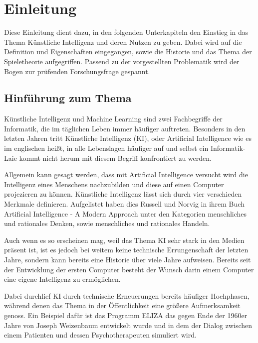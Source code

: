 
\chapter{Einleitung}
Diese Einleitung dient dazu, in den folgenden Unterkapiteln den Einstieg in das Thema Künstliche Intelligenz und deren Nutzen zu geben. Dabei wird auf die Definition und Eigenschaften eingegangen, sowie die Historie und das Thema der Spieletheorie aufgegriffen. Passend zu der vorgestellten Problematik wird der Bogen zur prüfenden Forschungsfrage gespannt.

\section{Hinführung zum Thema}
Künstliche Intelligenz und Machine Learning sind zwei Fachbegriffe der Informatik, die im täglichen Leben immer häufiger auftreten. Besonders in den letzten Jahren tritt Künstliche Intelligenz (\acs{KI}), oder Artificial Intelligence wie es im englischen heißt, in alle Lebenslagen häufiger auf und selbst ein Informatik-Laie kommt nicht herum mit diesem Begriff konfrontiert zu werden. 

Allgemein kann gesagt werden, dass mit Artificial Intelligence versucht wird die Intelligenz eines Menschens nachzubilden und diese auf einen Computer projezieren zu können. Künstliche Intelligenz lässt sich durch vier verschieden Merkmale definieren. Aufgelistet haben dies Russell und Norvig in ihrem Buch Artificial Intelligence - A Modern Approach unter den Kategorien menschliches und rationales Denken, sowie menschliches und rationales Handeln.\cite{Russell2010}

Auch wenn es so erscheinen mag, weil das Thema KI sehr stark in den Medien präsent ist, ist es jedoch bei weitem keine technische Errungenschaft der letzten Jahre, sondern kann bereits eine Historie über viele Jahre aufweisen. Bereits seit der Entwicklung der ersten Computer besteht der Wunsch darin einem Computer eine eigene Intelligenz zu ermöglichen.

Dabei durchlief KI durch technische Erneuerungen bereits häufiger Hochphasen, während denen das Thema in der Öffentlichkeit eine größere Aufmerksamkeit genoss. Ein Beispiel dafür ist das Programm ELIZA das gegen Ende der 1960er Jahre von Joseph Weizenbaum entwickelt wurde und in dem der Dialog zwischen einem Patienten und dessen Psychotherapeuten simuliert wird.\cite{Weizenbaum1966}

